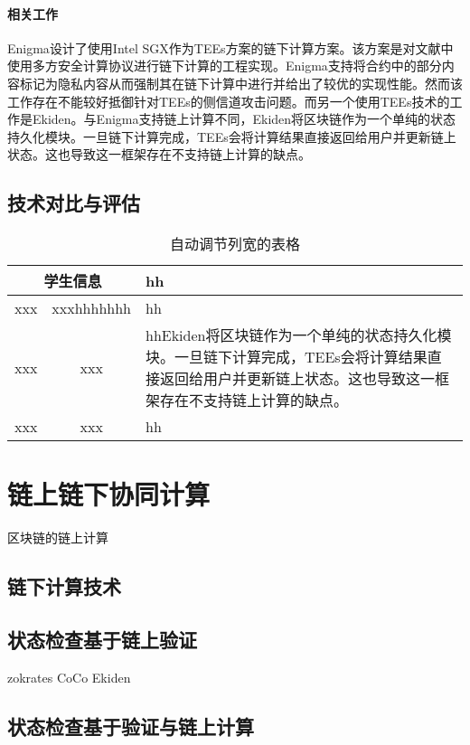 \paragraph{相关工作} 
Enigma\cite{enigma2019}设计了使用Intel SGX作为TEEs方案的链下计算方案。该方案是对文献\cite{2015arXiv150603471Z}中使用多方安全计算协议进行链下计算的工程实现。Enigma支持将合约中的部分内容标记为隐私内容从而强制其在链下计算中进行并给出了较优的实现性能。然而该工作存在不能较好抵御针对TEEs的侧信道攻击问题\cite{217543}。而另一个使用TEEs技术的工作是Ekiden\cite{2018arXiv180405141C}。与Enigma支持链上计算不同，Ekiden将区块链作为一个单纯的状态持久化模块。一旦链下计算完成，TEEs会将计算结果直接返回给用户并更新链上状态。这也导致这一框架存在不支持链上计算的缺点。

\subsection{技术对比与评估}
\begin{table}[htbp]
    \caption{\label{tab:ch2-1}自动调节列宽的表格}
    \begin{tabularx}{\linewidth}{c|c|X<{\centering}}
        \hline
        \multicolumn{2}{c|}{学生信息} & hh \\ \hline
        xxx & xxxhhhhhhh & hh \\ \hline
        xxx & xxx & hhEkiden将区块链作为一个单纯的状态持久化模块。一旦链下计算完成，TEEs会将计算结果直接返回给用户并更新链上状态。这也导致这一框架存在不支持链上计算的缺点。 \\ \hline
        xxx & xxx & hh \\ \hline
    \end{tabularx}
\end{table}

\section{链上链下协同计算}
区块链的链上计算

\subsection{链下计算技术}

\subsection{状态检查基于链上验证}

zokrates
CoCo
Ekiden

\subsection{状态检查基于验证与链上计算}

